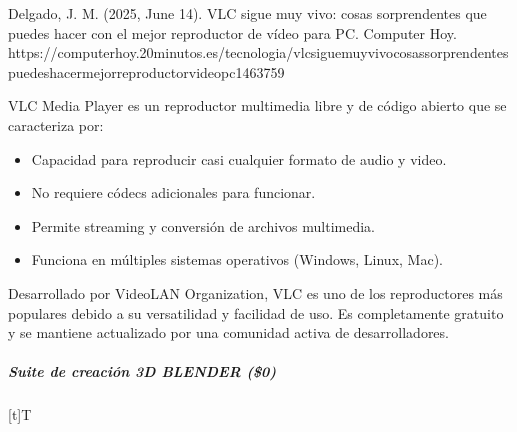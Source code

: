 \documentclass[letterpaper,10pt,spanish]{sphinxmanual}
\let\sphinxpxdimen\pdfpxdimen\else\newdimen\sphinxpxdimen
\begin{document}
\sphinxAtStartPar
%
\begin{footnote}[7]\sphinxAtStartFootnote
Delgado, J. M. (2025, June 14). VLC sigue muy vivo: cosas sorprendentes que puedes hacer con el mejor reproductor de vídeo para PC. Computer Hoy. https://computerhoy.20minutos.es/tecnologia/vlc\sphinxhyphen{}sigue\sphinxhyphen{}muy\sphinxhyphen{}vivo\sphinxhyphen{}cosas\sphinxhyphen{}sorprendentes\sphinxhyphen{}puedes\sphinxhyphen{}hacer\sphinxhyphen{}mejor\sphinxhyphen{}reproductor\sphinxhyphen{}video\sphinxhyphen{}pc\sphinxhyphen{}1463759
%
\end{footnote} VLC Media Player es un reproductor multimedia libre y de código abierto que se caracteriza por:
\begin{itemize}
\item {} 
\sphinxAtStartPar
Capacidad para reproducir casi cualquier formato de audio y video.

\item {} 
\sphinxAtStartPar
No requiere códecs adicionales para funcionar.

\item {} 
\sphinxAtStartPar
Permite streaming y conversión de archivos multimedia.

\item {} 
\sphinxAtStartPar
Funciona en múltiples sistemas operativos (Windows, Linux, Mac).

\end{itemize}

\sphinxAtStartPar
Desarrollado por VideoLAN Organization, VLC es uno de los reproductores más populares debido a su versatilidad y facilidad de uso. Es completamente gratuito y se mantiene actualizado por una comunidad activa de desarrolladores.


\subparagraph{Suite de creación 3D BLENDER (\$0)}
\label{\detokenize{cursos/ofimatica10/recursos/T02:suite-de-creacion-3d-blender-0}}

\begin{savenotes}\sphinxattablestart
\sphinxthistablewithglobalstyle
\centering
\begin{tabulary}{\linewidth}[t]{T}
\sphinxtoprule
\sphinxtableatstartofbodyhook

\begin{sphinxfigure-in-table}
\centering
\capstart
\noindent\sphinxincludegraphics[width=360\sphinxpxdimen]{{image081}.png}
\label{\detokenize{cursos/ofimatica10/recursos/T02:id40}}\end{sphinxfigure-in-table}\relax
\\
\sphinxbottomrule
\end{tabulary}
\sphinxtableafterendhook\par
\sphinxattableend\end{savenotes}
\end{document}
